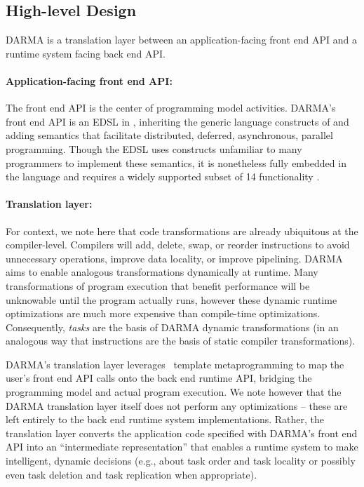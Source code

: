\subsection{High-level Design}
\gls{DARMA} is a translation layer between an 
application-facing \gls{front end} \gls{API} and a \gls{runtime system} facing \gls{back end} 
\gls{API}. 

\paragraph{Application-facing front end API:}
The \gls{front end} \gls{API} is the center of \gls{programming model}
activities.  \gls{DARMA}'s \gls{front end} \gls{API} 
is an \gls{EDSL} in \CC,  inheriting the generic
language constructs of \CC and adding \gls{semantics} that facilitate
distributed, deferred, asynchronous, parallel programming. Though the \gls{EDSL} uses
\CC constructs unfamiliar to many programmers to implement these semantics, 
it is nonetheless fully embedded in the \CC language and
requires a widely supported subset of \CC{}14 functionality \compilerReqs.

\paragraph{Translation layer:}
For context, we note here that code transformations are already ubiquitous at the compiler-level.
Compilers will add, delete, swap, or reorder instructions to avoid unnecessary operations, improve data locality, or improve pipelining.
\gls{DARMA} aims to enable analogous transformations dynamically at runtime.
Many transformations of program execution that benefit performance will be unknowable until the program actually runs,
however these dynamic runtime optimizations are much more expensive than compile-time optimizations.
Consequently, \emph{tasks} are the basis of \gls{DARMA} dynamic transformations
(in an analogous way that instructions are the basis of static compiler
transformations).

\gls{DARMA}'s \gls{translation layer} leverages \CC\ \gls{template
metaprogramming} to map the user's \gls{front end} \gls{API} calls onto the \gls{back end} runtime \gls{API},
bridging the \gls{programming model} and actual program execution.
We note however that the \gls{DARMA} \gls{translation layer} itself does not
perform any optimizations -- these are left entirely to the \gls{back end} \gls{runtime system} implementations.
Rather, the translation layer converts the application code specified with
\gls{DARMA}'s \gls{front end} \gls{API} into
an ``intermediate representation'' that enables a \gls{runtime system} to make
intelligent, dynamic decisions (e.g., 
about task order and task locality or possibly even task deletion and task
replication when appropriate).




